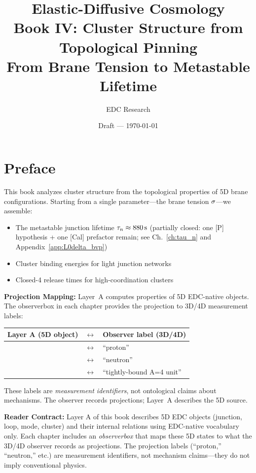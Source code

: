 \documentclass[11pt,a4paper,twoside,openright]{book}
\title{%
    \textbf{Elastic-Diffusive Cosmology}\\[0.5em]
    \Large Book IV: Cluster Structure from Topological Pinning\\[1em]
    \large From Brane Tension to Metastable Lifetime
}
\author{EDC Research}
\date{Draft — \today}
\begin{document}

\frontmatter

\maketitle

\chapter*{Preface}

This book analyzes cluster structure from the topological properties of 5D brane configurations. Starting from a single parameter---the brane tension $\sigma$---we assemble:
\begin{itemize}
    \item The metastable junction lifetime $\tau_n \approx 880\,\mathrm{s}$
          (partially closed: one [P] hypothesis + one [Cal] prefactor remain;
          see Ch.~\ref{ch:tau_n} and Appendix~\ref{app:L0delta_bvp})
    \item Cluster binding energies for light junction networks
    \item Closed-4 release times for high-coordination clusters
\end{itemize}

\textbf{Projection Mapping:}
Layer~A computes properties of 5D EDC-native objects. The observerbox in each
chapter provides the projection to 3D/4D measurement labels:
\begin{center}
\begin{tabular}{lcl}
    \textbf{Layer A (5D object)} & $\longleftrightarrow$ & \textbf{Observer label (3D/4D)} \\
    \midrule
    \AnchorJunction{} & $\longleftrightarrow$ & ``proton'' \\
    \MetastableJunction{} & $\longleftrightarrow$ & ``neutron'' \\
    \ClosedFour{} & $\longleftrightarrow$ & ``tightly-bound A=4 unit'' \\
\end{tabular}
\end{center}
These labels are \emph{measurement identifiers}, not ontological claims about
mechanisms. The observer records projections; Layer~A describes the 5D source.

\textbf{Reader Contract:}
Layer A of this book describes 5D EDC objects (junction, loop, mode, cluster) and their
internal relations using EDC-native vocabulary only. Each chapter includes an
\emph{observerbox} that maps these 5D states to what the 3D/4D observer records as
projections. The projection labels (``proton,'' ``neutron,'' etc.) are measurement
identifiers, not mechanism claims---they do not imply conventional physics.
\end{document}
